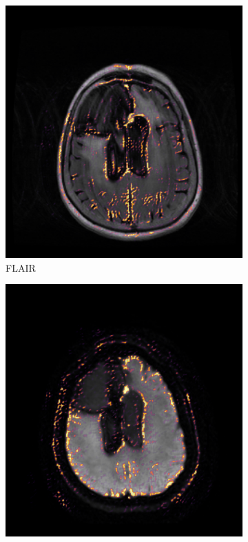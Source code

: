 \begin{figure}
    \begin{subfigure}[t]{\figexamplewidth}
        \centering
        \includegraphics[width=\textwidth]{Figures/FLAIR_saliency}
        \caption{\gls{FLAIR}}\label{fig:FLAIRCam}
    \end{subfigure}
    \begin{subfigure}[t]{\figexamplewidth}
        \centering
        \includegraphics[width=\textwidth]{Figures/DWI_saliency}

\end{subfigure}
\end{figure}
